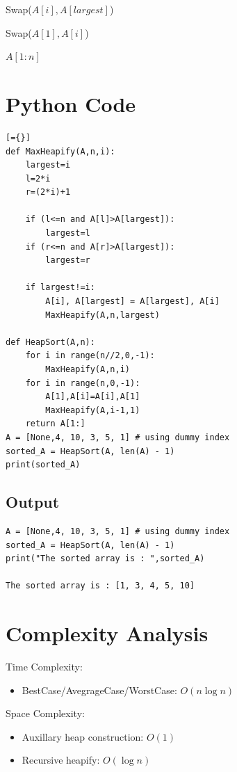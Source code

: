 \documentclass{article}
\begin{document}
{\begin{algorithm}
\begin{algorithmic}[1]
        \State Swap($A[i],A[largest]$)
        \State {}
    \EndIf
\EndProcedure

        \State {}
    \EndFor

        \State Swap($A[1],A[i]$)
        \State {}
    \EndFor

    \State \Return $A[1:n]$
\EndProcedure

\end{algorithmic}
\end{algorithm}
\section*{Python Code}
\begin{lstlisting}[={}]
def MaxHeapify(A,n,i):
    largest=i
    l=2*i
    r=(2*i)+1
    
    if (l<=n and A[l]>A[largest]):
        largest=l
    if (r<=n and A[r]>A[largest]):
        largest=r
    
    if largest!=i:
        A[i], A[largest] = A[largest], A[i]
        MaxHeapify(A,n,largest)

def HeapSort(A,n):
    for i in range(n//2,0,-1):
        MaxHeapify(A,n,i)
    for i in range(n,0,-1):
        A[1],A[i]=A[i],A[1]
        MaxHeapify(A,i-1,1)
    return A[1:]    
A = [None,4, 10, 3, 5, 1] # using dummy index
sorted_A = HeapSort(A, len(A) - 1)
print(sorted_A)
\end{lstlisting}
\subsection*{Output}
\begin{lstlisting}
A = [None,4, 10, 3, 5, 1] # using dummy index
sorted_A = HeapSort(A, len(A) - 1)
print("The sorted array is : ",sorted_A)

The sorted array is : [1, 3, 4, 5, 10]
\end{lstlisting}  
\section*{Complexity Analysis}
Time Complexity:
\begin{itemize}
    \item BestCase/AvegrageCase/WorstCase: $O(n \log n)$
\end{itemize}
Space Complexity:
\begin{itemize}
    \item Auxillary heap construction: $O(1)$
    \item Recursive heapify: $O( \log n)$
\end{itemize}
}
\end{document}
